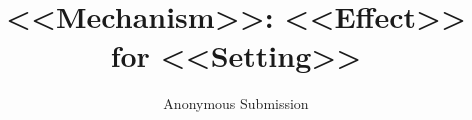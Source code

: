 \documentclass[runningheads]{llncs}   %
\newif\ifanon   \anontrue    %
\begin{document}
\title{<<Mechanism>>: <<Effect>> for <<Setting>>}
\ifanon
  \author{Anonymous Submission}
  \institute{}
\else
\fi
\maketitle




\ifanon\else
\subsubsection*{Acknowledgements.} <<Acknowledgements (camera-ready only).>>
\fi



\appendix

\end{document}
